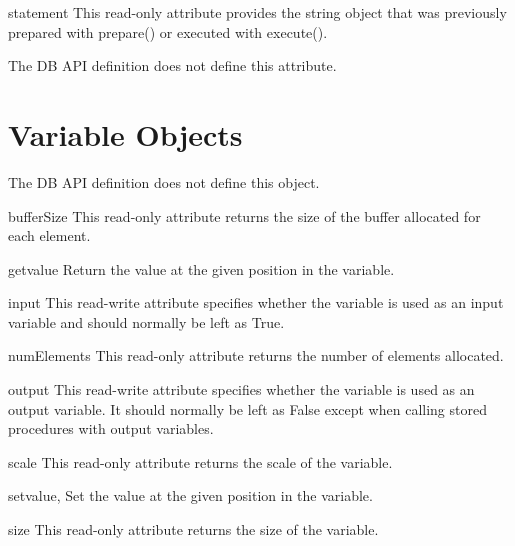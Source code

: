\documentclass{manual}
\begin{document}
\begin{datadesc}{statement}
  This read-only attribute provides the string object that was previously
  prepared with prepare() or executed with execute().

   The DB API definition does not define this attribute.
\end{datadesc}

\chapter{Variable Objects\label{varobj}}

 The DB API definition does not define this object.

\begin{datadesc}{bufferSize}
  This read-only attribute returns the size of the buffer allocated for each
  element.
\end{datadesc}

\begin{funcdesc}{getvalue}{}
  Return the value at the given position in the variable.
\end{funcdesc}

\begin{datadesc}{input}
  This read-write attribute specifies whether the variable is used as an input
  variable and should normally be left as True.
\end{datadesc}

\begin{datadesc}{numElements}
  This read-only attribute returns the number of elements allocated.
\end{datadesc}

\begin{datadesc}{output}
  This read-write attribute specifies whether the variable is used as an output
  variable. It should normally be left as False except when calling stored
  procedures with output variables.
\end{datadesc}

\begin{datadesc}{scale}
  This read-only attribute returns the scale of the variable.
\end{datadesc}

\begin{funcdesc}{setvalue}{, }
  Set the value at the given position in the variable.
\end{funcdesc}

\begin{datadesc}{size}
  This read-only attribute returns the size of the variable.
\end{datadesc}


\end{document}
